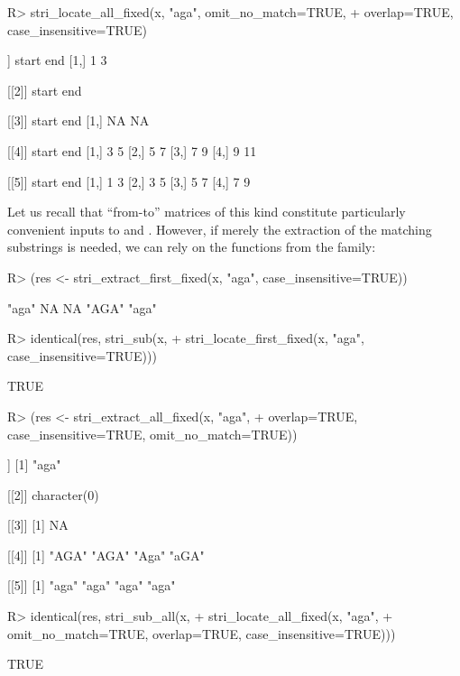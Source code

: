 \documentclass[nojss]{jss}\usepackage[]{graphicx}\usepackage[]{color}
\begin{document}
\begin{Schunk}
\begin{Sinput}
R> stri_locate_all_fixed(x, "aga", omit_no_match=TRUE,
+    overlap=TRUE, case_insensitive=TRUE)
\end{Sinput}
\begin{Soutput}
[[1]]
     start end
[1,]     1   3

[[2]]
     start end

[[3]]
     start end
[1,]    NA  NA

[[4]]
     start end
[1,]     3   5
[2,]     5   7
[3,]     7   9
[4,]     9  11

[[5]]
     start end
[1,]     1   3
[2,]     3   5
[3,]     5   7
[4,]     7   9
\end{Soutput}
\end{Schunk}



\medskip
Let us recall that ``from-to'' matrices of this kind constitute particularly
convenient inputs to  and .
However, if merely the extraction of the matching substrings is needed,
we can rely on the functions from the  family:

\begin{Schunk}
\begin{Sinput}
R> (res <- stri_extract_first_fixed(x, "aga", case_insensitive=TRUE))
\end{Sinput}
\begin{Soutput}
[1] "aga" NA    NA    "AGA" "aga"
\end{Soutput}
\begin{Sinput}
R> identical(res, stri_sub(x,
+    stri_locate_first_fixed(x, "aga", case_insensitive=TRUE)))
\end{Sinput}
\begin{Soutput}
[1] TRUE
\end{Soutput}
\begin{Sinput}
R> (res <- stri_extract_all_fixed(x, "aga",
+    overlap=TRUE, case_insensitive=TRUE, omit_no_match=TRUE))
\end{Sinput}
\begin{Soutput}
[[1]]
[1] "aga"

[[2]]
character(0)

[[3]]
[1] NA

[[4]]
[1] "AGA" "AGA" "Aga" "aGA"

[[5]]
[1] "aga" "aga" "aga" "aga"
\end{Soutput}
\begin{Sinput}
R> identical(res, stri_sub_all(x,
+    stri_locate_all_fixed(x, "aga",
+      omit_no_match=TRUE, overlap=TRUE, case_insensitive=TRUE)))
\end{Sinput}
\begin{Soutput}
[1] TRUE
\end{Soutput}
\end{Schunk}
\end{document}
